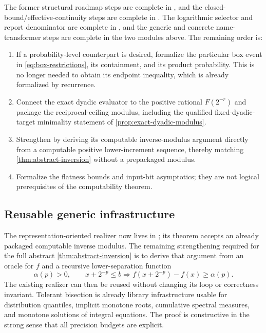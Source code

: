 \documentclass[11pt,oneside]{article}
\theoremstyle{definition}
\theoremstyle{remark}
\numberwithin{equation}{section}
\begin{document}
The former structural roadmap steps are complete in
, and the closed-bound/effective-continuity steps are
complete in .  The logarithmic
selector and report denominator are complete in
, and the generic and concrete
name-transformer steps are complete in the two modules above.  The remaining
order is:

\begin{enumerate}
\item If a probability-level counterpart is desired, formalize the particular
      box event in \eqref{eq:box-restrictions}, its containment, and its product
      probability.  This is no longer needed to obtain its endpoint
      inequality, which is already formalized by recurrence.
\item Connect the exact dyadic evaluator to the positive rational
      $F(2^{-r})$ and package the reciprocal-ceiling modulus, including the
      qualified fixed-dyadic-target minimality statement of
      \cref{prop:exact-dyadic-modulus}.
\item Strengthen  by deriving its computable
      inverse-modulus argument directly from a computable positive
      lower-increment sequence, thereby matching
      \cref{thm:abstract-inversion} without a prepackaged modulus.
\item Formalize the flatness bounds
      and input-bit asymptotics; they are not logical prerequisites of the
      computability theorem.
\end{enumerate}

\subsection{Reusable generic infrastructure}

The representation-oriented realizer now lives in
; its theorem accepts an already packaged
computable inverse modulus.  The remaining strengthening required for the
full abstract \cref{thm:abstract-inversion} is to derive that argument from an
oracle for $f$ and a recursive lower-separation function
\[
  \alpha(p)>0,
  \qquad x+2^{-p}\le b
  \Longrightarrow f(x+2^{-p})-f(x)\ge\alpha(p).
\]
The existing realizer can then be reused without changing its loop or
correctness invariant.  Tolerant bisection is already library infrastructure usable for distribution quantiles,
implicit monotone roots, cumulative spectral measures, and monotone solutions
of integral equations.  The proof is constructive in the strong sense that
all precision budgets are explicit.
\end{document}
